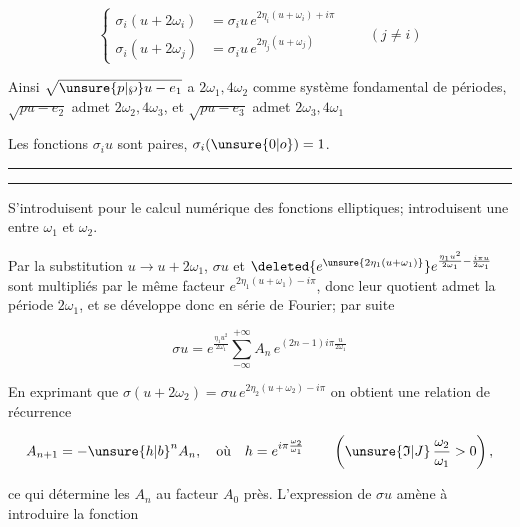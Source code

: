 \[
\left\{\begin{aligned}
\sigma_i(u+2\omega_i)&=\sigma_i u\,e^{2\eta_i(u+\omega_i)+i\pi}\\
\sigma_i(u+2\omega_j)&=\sigma_i u\,e^{2\eta_j(u+\omega_j)}
\end{aligned}\right.\qquad(j\ne i)
\tag*{(26)}
\]

Ainsi $\sqrt{\unsure{p|\wp}u-e_1}$ a $2\omega_1,4\omega_2$ comme système fondamental de périodes, $\sqrt{pu-e_2}$ admet $2\omega_2,4\omega_3$, et $\sqrt{pu-e_3}$ admet $2\omega_3,4\omega_1$

Les fonctions $\sigma_i u$ sont paires, $\sigma_i(\unsure{0|o})=1$.

\par\noindent\rule{\linewidth}{.4pt}\par\vspace{-1ex}\noindent\rule{\linewidth}{.4pt}\par
\begin{center}\end{center}

S'introduisent pour le calcul numérique des fonctions elliptiques; introduisent une  entre $\omega_1$ et $\omega_2$.

Par la substitution $u\to u+2\omega_1$, $\sigma u$ et $\deleted{e^{\unsure{2\eta_1(u+\omega_1)}}}e^{\frac{\eta_1 u^2}{2\omega_1}-\frac{i\pi u}{2\omega_1}}$ sont multipliés par le même facteur $e^{2\eta_1(u+\omega_1)-i\pi}$, donc leur quotient admet la période $2\omega_1$, et se développe donc en série de Fourier; par suite

\[
\sigma u=e^{\frac{\eta_1u^2}{2\omega_1}}\sum_{-\infty}^{+\infty} A_n\,e^{(2n-1)i\pi\frac{u}{2\omega_1}}
\tag*{1}
\]

En exprimant que $\sigma(u+2\omega_2)=\sigma u\,e^{2\eta_2(u+\omega_2)-i\pi}$ on obtient une relation de récurrence

\[
A_{n+1}=-{\unsure{h|b}}^nA_n,\quad\text{où}\quad h=e^{i\pi\frac{\omega_2}{\omega_1}}
\qquad\left(\unsure{\mathfrak I|J}\,\frac{\omega_2}{\omega_1}>0\right),
\]

ce qui détermine les $A_n$  au facteur $A_0$ près. L'expression de $\sigma u$ amène à introduire la fonction

